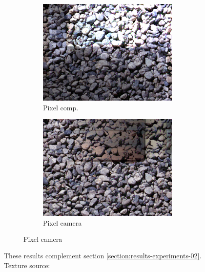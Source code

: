 \begin{figure}[]
\begin{subfigure}{\textwidth}
\begin{subfigure}{0.24\textwidth}
            \includegraphics[width=\textwidth]{images/04-experiment02/carpet/pebbles/pixel_im.jpg}
            \caption*{Pixel comp.}
        \end{subfigure}
        \hfill
        \begin{subfigure}{0.24\textwidth}
            \centering
            \includegraphics[width=\textwidth]{images/04-experiment02/carpet/pebbles/pixel_proj.jpg}
            \caption*{Pixel camera}
        \end{subfigure}
    \end{subfigure}
    \caption{These results complement section \ref{section:results-experiments-02}. Texture source: \citet{Pixar128}}
    \label{fig:ex02-complete-carpet-marble_wood_pebbles}
\end{figure}

